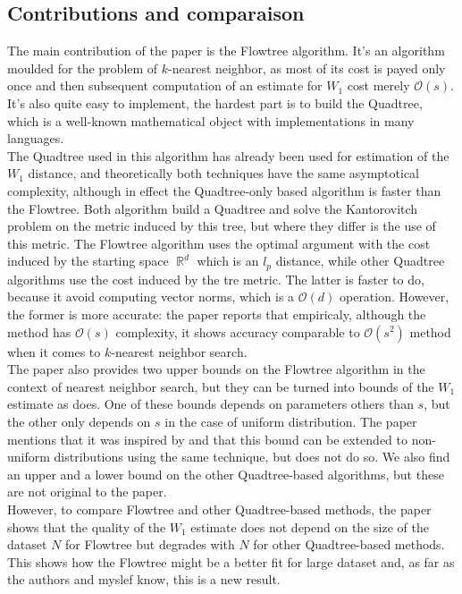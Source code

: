 \documentclass[11pt]{article}
\DeclareMathOperator\R{\mathbb{R}}
\begin{document}
\subsection{Contributions and comparaison}
The main contribution of the paper is the Flowtree algorithm. It's an algorithm moulded for the problem of $k$-nearest neighbor, as most of its cost is payed only once and then subsequent computation of an estimate for $W_1$ cost merely $\mathcal{O}(s)$. It's also quite easy to implement, the hardest part is to build the Quadtree, which is a well-known mathematical object with implementations in many languages.\\
The Quadtree used in this algorithm has already been used for estimation of the $W_1$ distance, and theoretically both techniques have the same asymptotical complexity, although in effect the Quadtree-only based algorithm is faster than the Flowtree. Both algorithm build a Quadtree and solve the Kantorovitch problem on the metric induced by this tree, but where they differ is the use of this metric. The Flowtree algorithm uses the optimal argument with the cost induced by the starting space $\R^d$ which is an $l_p$ distance, while other Quadtree algorithms use the cost induced by the tre metric. The latter is faster to do, because it avoid computing vector norms, which is a $\mathcal{O}(d)$ operation. However, the former is more accurate: the paper \cite{Flowtree} reports that empiricaly, although the method has $\mathcal{O}(s)$ complexity, it shows accuracy comparable to $\mathcal{O}(s^2)$ method when it comes to $k$-nearest neighbor search.\\
The paper also provides two upper bounds on the Flowtree algorithm in the context of nearest neighbor search, but they can be turned into bounds of the $W_1$ estimate as  \cite{ReviewOfTreeMethods} does. One of these bounds depends on parameters others than $s$, but the other only depends on $s$ in the case of uniform distribution. The paper mentions that it was inspired by \cite{TwOW1approx} and that this bound can be extended to non-uniform distributions using the same technique, but does not do so.
We also find an upper and a lower bound on the other Quadtree-based algorithms, but these are not original to the paper.\\
However, to compare Flowtree and other Quadtree-based methods, the paper shows that the quality of the $W_1$ estimate does not depend on the size of the dataset $N$ for Flowtree but degrades with $N$ for other Quadtree-based methods. This shows how the Flowtree might be a better fit for large dataset and, as far as the authors and myslef know, this is a new result.\\
\end{document}
